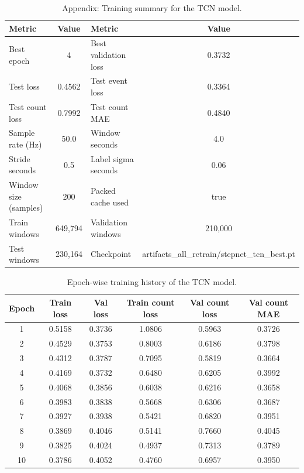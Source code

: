 \begin{table}[htbp]
\centering
\caption{Appendix: Training summary for the TCN model.}
\label{tab:appendix_tcn_summary}
\small
\begin{tabularx}{\textwidth}{@{}l c l c@{}}
\toprule
Metric & Value & Metric & Value \\
\midrule
Best epoch & 4 & Best validation loss & 0.3732 \\
Test loss & 0.4562 & Test event loss & 0.3364 \\
Test count loss & 0.7992 & Test count MAE & 0.4840 \\
Sample rate (Hz) & 50.0 & Window seconds & 4.0 \\
Stride seconds & 0.5 & Label sigma seconds & 0.06 \\
Window size (samples) & 200 & Packed cache used & true \\
Train windows & 649,794 & Validation windows & 210,000 \\
Test windows & 230,164 & Checkpoint & artifacts\_all\_retrain/stepnet\_tcn\_best.pt \\
\bottomrule
\end{tabularx}
\end{table}

\begin{table}[htbp]
\centering
\caption{Epoch-wise training history of the TCN model.}
\label{tab:appendix_tcn_history}
\small
\begin{tabular}{@{}c c c c c c@{}}
\toprule
Epoch & Train loss & Val loss & Train count loss & Val count loss & Val count MAE \\
\midrule
1 & 0.5158 & 0.3736 & 1.0806 & 0.5963 & 0.3726 \\
2 & 0.4529 & 0.3753 & 0.8003 & 0.6186 & 0.3798 \\
3 & 0.4312 & 0.3787 & 0.7095 & 0.5819 & 0.3664 \\
4 & 0.4169 & 0.3732 & 0.6480 & 0.6205 & 0.3992 \\
5 & 0.4068 & 0.3856 & 0.6038 & 0.6216 & 0.3658 \\
6 & 0.3983 & 0.3838 & 0.5668 & 0.6306 & 0.3687 \\
7 & 0.3927 & 0.3938 & 0.5421 & 0.6820 & 0.3951 \\
8 & 0.3869 & 0.4046 & 0.5141 & 0.7660 & 0.4045 \\
9 & 0.3825 & 0.4024 & 0.4937 & 0.7313 & 0.3789 \\
10 & 0.3786 & 0.4052 & 0.4760 & 0.6957 & 0.3950 \\
\bottomrule
\end{tabular}
\end{table}

